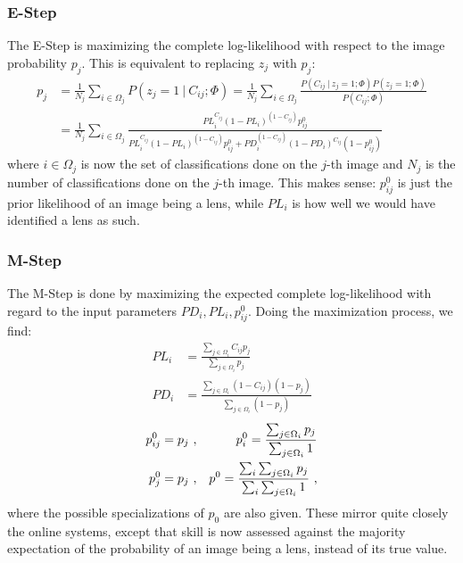 \documentclass[useAMS,usenatbib,a4paper]{mn2e}
\begin{document}
\subsubsection{E-Step}
\label{sec:formalism:em:estep}
The E-Step is maximizing the complete log-likelihood with respect to the image
probability $p_j$.  This is equivalent to replacing $z_j$ with $p_j$:
\begin{align}
  p_j &= \frac{1}{N_j} \sum_{i \in \Omega_j} P(z_j = 1 \ | \ C_{ij} ; \Phi) =
  \frac{1}{N_j} \sum_{i \in \Omega_j} \frac{ P(C_{ij} \ | \ z_j = 1; \Phi)
P(z_j = 1 ; \Phi)}{P(C_{ij} ; \Phi)} \\
&= \frac{1}{N_j} \sum_{i \in \Omega_j} \frac{ PL_{i}^{C_{ij}} (1 - PL_{i})^{(1 -
C_{ij})} p_{ij}^{0}}{ PL_{i}^{C_{ij}} (1 -
  PL_{i})^{(1 - C_{ij})} p_{ij}^{0} + PD_{i}^{(1 - C_{ij})} (1 -
PD_{i})^{C_{ij}} (1 - p_{ij}^{0})}
\end{align}
where $i \in \Omega_j$ is now the set of classifications done on the $j$-th
image and $N_j$ is the number of classifications done on the $j$-th image. This
makes sense: $p_{ij}^{0}$ is just the prior likelihood of an image being a lens,
while $PL_{i}$ is how well we would have identified a lens as such.


\subsubsection{M-Step}
\label{sec:formalism:em:mstep}
The M-Step is done by maximizing the expected complete log-likelihood with
regard to the input parameters $PD_{i}, PL_{i}, p_{ij}^{0}$. Doing the
maximization process, we find:
\begin{align}
  PL_{i} &= \frac{\sum_{j \in \Omega_i} C_{ij} p_{j}}{\sum_{j \in
\Omega_i} p_{j}} \\
  PD_{i} &= \frac{\sum_{j \in \Omega_i} (1 - C_{ij}) (1 - p_{j})}{\sum_{j \in
\Omega_i} (1 - p_{j})}
\end{align}
\begin{align}
  p_{ij}^{0} &= p_{j} \ , &p_{i}^{0} = \frac{\sum_{j \in \Omega_i}
p_{j}}{\sum_{j \in \Omega_i} 1} \notag\\
   p_{j}^{0} &= p_{j} \ , &p^{0} = \frac{\sum_i \sum_{j \in \Omega_i}
p_{j}}{\sum_i \sum_{j \in
  \Omega_i} 1} \ ,
\end{align}
where the possible specializations of $p_0$ are also given. These mirror quite
closely the online systems, except that skill is now assessed against
the majority expectation of the probability of an image being a lens, instead
of its true value.
\end{document}
